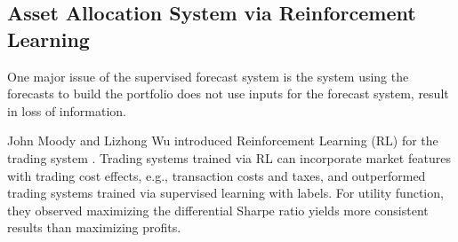 \subsection{Asset Allocation System via Reinforcement Learning}
One major issue of the supervised forecast system is the system using the forecasts to build the portfolio does not use inputs for the forecast system, result in loss of information.
\par
John Moody and Lizhong Wu introduced Reinforcement Learning (RL) for the trading system \cite{618952}. Trading systems trained via RL can incorporate market features with trading cost effects, e.g., transaction costs and taxes, and outperformed trading systems trained via supervised learning with labels. For utility function, they observed maximizing the differential Sharpe ratio yields more consistent results than maximizing profits\cite{618952}.